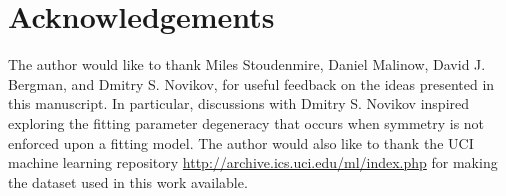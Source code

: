 \documentclass[twocolumn, nofootinbib, aps, prb]{revtex4-1}
\begin{document}
\section{Acknowledgements}

The author would like to thank Miles Stoudenmire, Daniel Malinow, David J. Bergman, and Dmitry S. Novikov, for useful feedback on the ideas presented in this manuscript. In particular, discussions with Dmitry S. Novikov inspired exploring the fitting parameter degeneracy
that occurs when symmetry is not enforced upon a fitting model. The author would also like to thank the UCI machine learning repository \url{http://archive.ics.uci.edu/ml/index.php} for making the dataset used in this work available.

\vskip -0.2in

%


%



\vskip 0.2in
\end{document}
